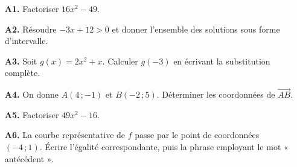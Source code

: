 \documentclass[10pt,a4paper]{article}
\begin{document}
\newpage
{}
\begin{enumerate}
\needspace{22mm}
\item[\textbf{A1.}] Factoriser $16x^2 - 49$.
\par\vspace{1.2mm}
\needspace{22mm}
\item[\textbf{A2.}] Résoudre $-3x + 12 > 0$ et donner l'ensemble des solutions sous forme d'intervalle.
\par\vspace{1.2mm}
\needspace{22mm}
\item[\textbf{A3.}] Soit $g(x) = 2x^2 + x$. Calculer $g(-3)$ en écrivant la substitution complète.
\par\vspace{1.2mm}
\needspace{22mm}
\item[\textbf{A4.}] On donne $A(4\,;-1)$ et $B(-2\,;5)$. Déterminer les coordonnées de $\vec{AB}$.
\par\vspace{1.2mm}
\needspace{22mm}
\item[\textbf{A5.}] Factoriser $49x^2 - 16$.
\par\vspace{1.2mm}
\needspace{22mm}
\item[\textbf{A6.}] La courbe représentative de $f$ passe par le point de coordonnées $(-4\,;1)$. Écrire l'égalité correspondante, puis la phrase employant le mot « antécédent ».
\par\vspace{1.2mm}
\end{enumerate}
\needspace{68mm}\par\vspace{3mm}
\end{document}
